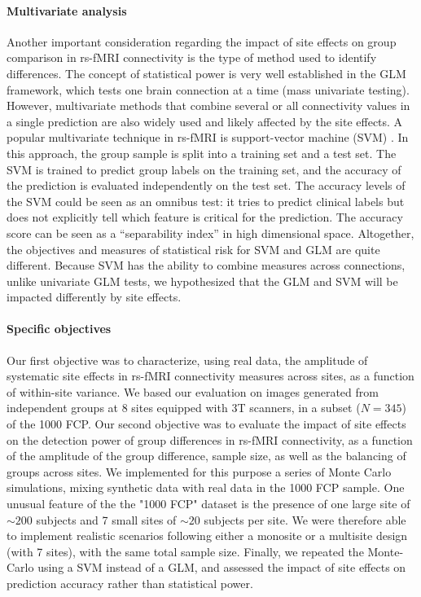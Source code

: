 \documentclass[authoryear]{elsarticle}
\begin{document}
\paragraph{Multivariate analysis}
Another important consideration regarding the impact of site effects on group comparison in rs-fMRI connectivity is the type of method used to identify differences. The concept of statistical power is very well established in the GLM framework, which tests one brain connection at a time (mass univariate testing). However, multivariate methods that combine several or all connectivity values in a single prediction are also widely used and likely affected by the site effects. A popular multivariate technique in rs-fMRI is support-vector machine (SVM) \citep{Cortes1995}. In this approach, the group sample is split into a training set and a test set. The SVM is trained to predict group labels on the training set, and the accuracy of the prediction is evaluated independently on the test set.  The accuracy levels of the SVM could be seen as an omnibus test: it tries to predict clinical labels but does not explicitly tell which feature is critical for the prediction. The accuracy score can be seen as a “separability index” in high dimensional space. Altogether, the objectives and measures of statistical risk for SVM and GLM are quite different. Because SVM has the ability to combine measures across connections, unlike univariate GLM tests, we hypothesized that the GLM and SVM will be impacted differently by site effects. 

\paragraph{Specific objectives}
Our first objective was to characterize, using real data, the amplitude of
systematic site effects in rs-fMRI connectivity measures across sites, as a function
of within-site variance. We based our evaluation on images generated from
independent groups at 8 sites equipped with 3T scanners, in a subset
($N=345$) of the 1000 FCP. Our second objective was to evaluate the impact of
site effects on the detection power of group differences in rs-fMRI
connectivity, as a function of the amplitude of the group difference, sample
size, as well as the balancing of groups across sites. We implemented for this
purpose a series of Monte Carlo simulations, mixing synthetic data with real
data in the 1000 FCP sample. One unusual feature of the the "1000 FCP" dataset is the presence of one large site of $\sim200$ subjects and 7 small sites of $\sim20$ subjects per site. We were therefore able to implement realistic scenarios following either a monosite or a multisite design (with 7 sites), with the same total sample size. Finally, we repeated the Monte-Carlo using a SVM instead of a GLM, and assessed the impact of site effects on prediction accuracy rather than statistical power.
\end{document}
